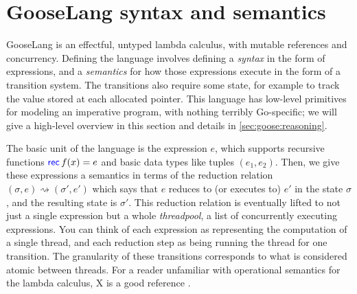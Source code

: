 \section{GooseLang syntax and semantics}%
\label{sec:goose:semantics}

\newcommand{\goosedef}[1]{\mathsf{#1}}
\newcommand{\goosekw}[1]{\goosedef{\textcolor{blue}{#1}}}
\newcommand{\app}{\:}
\newcommand{\binop}{\circledcirc}
\newcommand{\unop}{\circleddash}

\newcommand{\external}{\mathsf{\textcolor{red}{\langle External \rangle}}}

\newcommand{\gooseif}[3]{\goosekw{if} \app #1 \app%
  \goosekw{then} \app #2 \app \goosekw{else} \app #3}

\newcommand{\recfx}{\goosekw{rec} \, f(x) = e}
\newcommand{\gooselambda}[1]{\goosekw{\lambda}#1.\,}

\newcommand{\reduces}{\rightsquigarrow}
\newcommand{\purereduction}{\overset{\mathrm{pure}}{\reduces}}

\newcommand{\seq}{;\,}
\newcommand{\defeq}{\triangleq}

GooseLang is an effectful, untyped lambda calculus, with mutable references and
concurrency. Defining the language involves defining a \emph{syntax} in the form
of expressions, and a \emph{semantics} for how those expressions execute in the
form of a transition system. The transitions also require some state, for
example to track the value stored at each allocated pointer. This language has
low-level primitives for modeling an imperative program, with nothing terribly
Go-specific; we will give a high-level overview in this section and details in
\autoref{sec:goose:reasoning}.

The basic unit of the language is the expression $e$, which supports recursive
functions $\recfx$ and basic data types like tuples $(e_1, e_2)$. Then, we give
these expressions a semantics in terms of the reduction relation
$(\sigma, e) \reduces (\sigma', e')$ which says that $e$ reduces to (or executes
to) $e'$ in the state $\sigma$, and the resulting state is $\sigma'$. This
reduction relation is eventually lifted to not just a single expression but a
whole \emph{threadpool}, a list of concurrently executing expressions. You
can think of each expression as representing the computation of a single thread,
and each reduction step as being running the thread for one transition. The
granularity of these transitions corresponds to what is considered atomic
between threads. For a reader unfamiliar with operational semantics for the
lambda calculus, X is a good reference .

